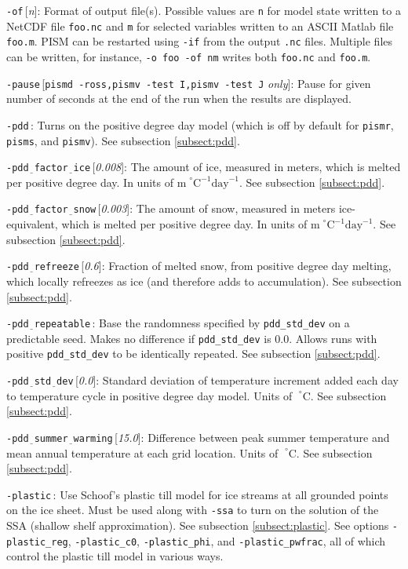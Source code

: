 \documentclass[11pt,final]{amsart}
\newcommand{\rawopt}[1]{\vspace{1mm}\noindent \large\texttt{-#1}\normalsize}
\newcommand{\opt}[1]{\rawopt{#1}\,:\quad}
\newcommand{\optdef}[2]{\rawopt{#1}\,[\textsl{#2}]:\quad}
\newcommand{\optrestrict}[2]{\rawopt{#1}\,[\texttt{#2} \textsl{only}]:\quad}
\newcommand{\und}{$\underline{\,\,\,}$}
\begin{document}
\optdef{of}{n}  Format of output file(s).  Possible values are \verb|n| for model state written to a NetCDF file \verb|foo.nc| and \verb|m| for selected variables written to an ASCII Matlab file \verb|foo.m|.  PISM can be restarted using \verb|-if| from the output \verb|.nc| files.  Multiple files can be written, for instance, \verb|-o foo -of nm| writes both \verb|foo.nc| and \verb|foo.m|.

\optrestrict{pause}{pismd -ross,pismv -test I,pismv -test J}    Pause for given number of seconds at the end of the run when the results are displayed.

\opt{pdd}  Turns on the positive degree day model (which is off by default for \verb|pismr|, \verb|pisms|, and \verb|pismv|).  See subsection \ref{subsect:pdd}.

\optdef{pdd\und factor\und ice}{0.008}  The amount of ice, measured in meters, which is melted per positive degree day.  In units of $\text{m}\!\phantom{|}^\circ\text{C}^{-1}\text{day}^{-1}$.  See subsection \ref{subsect:pdd}.

\optdef{pdd\und factor\und snow}{0.003}  The amount of snow, measured in meters ice-equivalent, which is melted per positive degree day.  In units of $\text{m}\phantom{|}^\circ\text{C}^{-1}\text{day}^{-1}$.  See subsection \ref{subsect:pdd}.

\optdef{pdd\und refreeze}{0.6}  Fraction of melted snow, from positive degree day melting, which locally refreezes as ice (and therefore adds to accumulation).  See subsection \ref{subsect:pdd}.

\opt{pdd\und repeatable}  Base the randomness specified by \verb|pdd_std_dev| on a predictable seed.  Makes no difference if \verb|pdd_std_dev| is 0.0.  Allows runs with positive \verb|pdd_std_dev| to be identically repeated.  See subsection \ref{subsect:pdd}.

\optdef{pdd\und std\und dev}{0.0}  Standard deviation of temperature increment added each day to temperature cycle in positive degree day model.  Units of $\phantom{|}^\circ\text{C}$.  See subsection \ref{subsect:pdd}.

\optdef{pdd\und summer\und warming}{15.0}  Difference between peak summer temperature and mean annual temperature at each grid location.  Units of $\phantom{|}^\circ\text{C}$.  See subsection \ref{subsect:pdd}.

\opt{plastic}  Use Schoof's plastic till model for ice streams at all grounded points on the ice sheet.  Must be used along with \verb|-ssa| to turn on the solution of the SSA (shallow shelf approximation).  See subsection \ref{subsect:plastic}.  See options \verb|-plastic_reg|, \verb|-plastic_c0|, \verb|-plastic_phi|, and \verb|-plastic_pwfrac|, all of which control the plastic till model in various ways.
\end{document}
